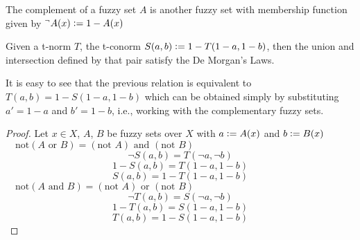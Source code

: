 \begin{definition}[Complement]
    The complement of a fuzzy set $A$ is another fuzzy set with membership function given by $^\lnot A(x) \mathrel{\mathop:}= 1 - A(x)$
\end{definition}

\begin{definition}
  
\end{definition}

\begin{definition}
  
\end{definition}

\begin{proposition}
  Given a t-norm $T$, the t-conorm $S(a,b)\mathrel{\mathop:}= 1 - T(1-a, 1-b)$, then the union and intersection defined by that pair satisfy the De Morgan's Laws.
\end{proposition}
\begin{remark}
  It is easy to see that the previous relation is equivalent to $T(a,b) = 1-S(1-a, 1-b)$ which can be obtained simply by substituting $a'=1-a$ and $b'=1-b$, i.e., working with the complementary fuzzy sets.
\end{remark}

\begin{proof}
  Let $x\in X$, $A$, $B$ be fuzzy sets over $X$ with $a \mathrel{\mathop:}= A(x)$ and $b \mathrel{\mathop:}= B(x)$\\

  $\quad \boxed{\text{not}(A \text{ or } B) = (\text{not } A) \text{ and } (\text{not } B)}$\\
  $$\lnot S(a,b) = T(\lnot a, \lnot b)$$
  $$1 - S(a,b) = T(1-a, 1-b)$$
  $$S(a,b) = 1 - T(1-a, 1-b)$$
  $\quad \boxed{\text{not}(A \text{ and } B) = (\text{not } A) \text{ or } (\text{not } B)}$\\
  $$\lnot T(a,b) = S(\lnot a, \lnot b)$$
  $$1 - T(a,b) = S(1-a, 1-b)$$
  $$T(a,b) = 1 - S(1-a, 1-b)$$

\end{proof}

\begin{definition}
  
\end{definition}
\begin{proposition}
  
\end{proposition}

